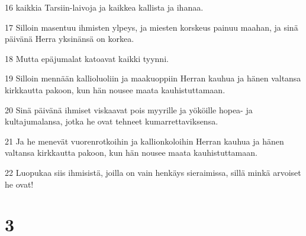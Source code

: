 \par 16 kaikkia Tarsiin-laivoja ja kaikkea kallista ja ihanaa.
\par 17 Silloin masentuu ihmisten ylpeys, ja miesten korskeus painuu maahan, ja sinä päivänä Herra yksinänsä on korkea.
\par 18 Mutta epäjumalat katoavat kaikki tyynni.
\par 19 Silloin mennään kallioluoliin ja maakuoppiin Herran kauhua ja hänen valtansa kirkkautta pakoon, kun hän nousee maata kauhistuttamaan.
\par 20 Sinä päivänä ihmiset viskaavat pois myyrille ja yököille hopea- ja kultajumalansa, jotka he ovat tehneet kumarrettaviksensa.
\par 21 Ja he menevät vuorenrotkoihin ja kallionkoloihin Herran kauhua ja hänen valtansa kirkkautta pakoon, kun hän nousee maata kauhistuttamaan.
\par 22 Luopukaa siis ihmisistä, joilla on vain henkäys sieraimissa, sillä minkä arvoiset he ovat!

\chapter{3}

